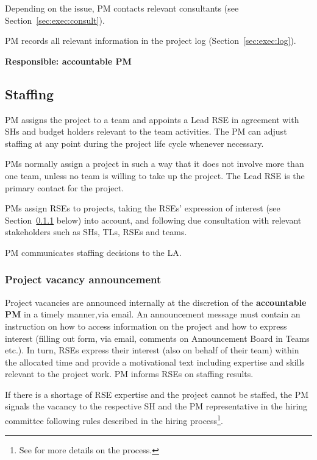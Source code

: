 \documentclass[11pt]{article}
\begin{document}
Depending on the issue, PM contacts relevant consultants (see Section~\ref{sec:exec:consult}).

PM records all relevant information in the project log (Section~\ref{sec:exec:log}).

\textbf{Responsible: accountable PM}



\subsection{Staffing}
PM assigns the project to a team and appoints a Lead RSE in agreement with SHs and budget
holders relevant to the team activities. The PM can adjust staffing at any point during the project life cycle
whenever necessary.

PMs normally assign a project in such a way that it does not involve more than one team, unless no team is willing to
take up the project. The Lead RSE is the primary contact for the project.

PMs assign RSEs to projects, taking the RSEs' expression of interest (see Section~\ref{sec:init:vacancy} below) into account, and following due consultation with relevant stakeholders such as SHs,
TLs, RSEs and teams. 

PM communicates staffing decisions to the LA. 

\subsubsection{Project vacancy announcement}
\label{sec:init:vacancy}
Project vacancies are announced internally at the discretion of the \textbf{accountable PM} in a timely manner,via email. An announcement message must contain an instruction on how to access information on the project and how to
express interest (filling out form, via email, comments on Announcement Board in Teams etc.). In turn, RSEs express
their interest (also on behalf of their team) within the allocated time and provide a motivational text including
expertise and skills relevant to the project work. PM informs RSEs on staffing results.

If there is a shortage of RSE expertise and the project cannot be staffed, the PM signals the vacancy to the respective
SH and the PM representative in the hiring committee following rules described in the hiring process\footnote{See
\href{https://nlesc.sharepoint.com/sites/home/SitePages/recruitment-&-vacancies.aspx}{} for more details on the process.}.
\end{document}
